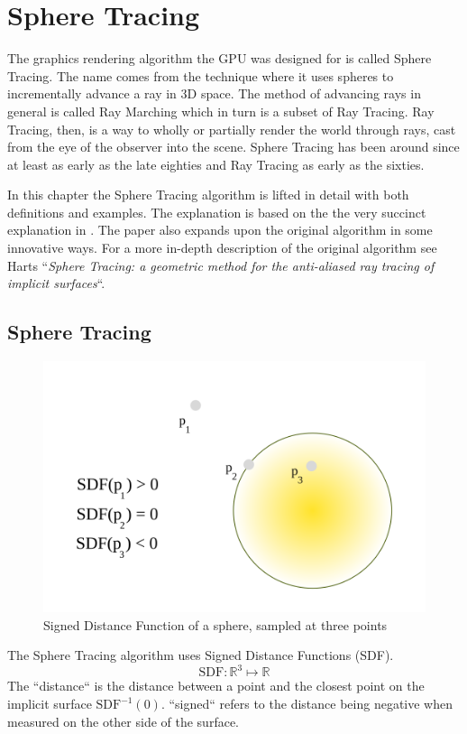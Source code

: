 \chapter{Sphere Tracing} \label{spheretracing}

	The graphics rendering algorithm the GPU was designed for is called
	Sphere Tracing\cite{Hart1996}. The name comes from the technique where it
	uses spheres to incrementally advance a ray in 3D space. The method of
	advancing rays in general is called Ray Marching which in turn is a subset
	of Ray Tracing\cite{Whitted1980a}. Ray Tracing, then, is a way to wholly or
	partially render the world through rays, cast from the eye of the observer
	into the scene. Sphere Tracing has been around since at least as early as
	the late eighties\cite{Hart1989} and Ray Tracing as early as the
	sixties\cite{Appel1968}.

	In this chapter the Sphere Tracing algorithm is lifted in detail with
	both definitions and examples. The explanation is based on the the very
	succinct explanation in \cite{Korndorfer2014}. The paper also expands upon
	the original algorithm in some innovative ways. For a more in-depth
	description of the original algorithm see Harts ``\emph{Sphere Tracing: a
	geometric method for the anti-aliased ray tracing of implicit
	surfaces}``\cite{Hart1996}.

	\section{Sphere Tracing} 

		\begin{figure}
			\includegraphics[width=0.75\linewidth]{figure/SDF} 
			\caption{Signed Distance Function of a sphere, sampled at three 
				points}
		\end{figure}

		The Sphere Tracing algorithm uses Signed Distance Functions (SDF).
		$$\text{SDF}:\mathbb{R}^{3}\mapsto\mathbb{R}$$ The ``distance`` is the
		distance between a point and the closest point on the implicit surface
		$\text{SDF}^{-1}(0)$. ``signed`` refers to the distance being negative
		when measured on the other side of the surface. 

